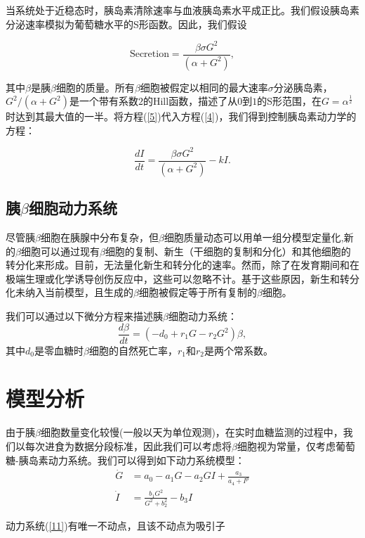 当系统处于近稳态时，胰岛素清除速率与血液胰岛素水平成正比。我们假设胰岛素分泌速率模拟为葡萄糖水平的S形函数\cite{topp2000model}。因此，我们假设

\begin{equation}\label{5}
\text{Secretion} = \frac{\beta\sigma G^2}{(\alpha + G^2)},
\end{equation}

其中$\beta$是胰$\beta$细胞的质量。所有$\beta$细胞被假定以相同的最大速率$\sigma$分泌胰岛素，\(G^2/(\alpha + G^2)\)是一个带有系数$2$的Hill函数，描述了从$0$到$1$的S形范围，在$G=\alpha^{\frac{1}{2}}$时达到其最大值的一半。将方程(\ref{5})代入方程(\ref{4})，我们得到控制胰岛素动力学的方程：

\begin{equation}
    \frac{dI}{dt} = \frac{\beta\sigma G^2}{(\alpha + G^2)} - kI.
\end{equation}

\subsection{胰\(\beta\)细胞动力系统}
尽管胰$\beta$细胞在胰腺中分布复杂，但$\beta$细胞质量动态可以用单一组分模型定量化,新的$\beta$细胞可以通过现有$\beta$细胞的复制、新生（干细胞的复制和分化）和其他细胞的转分化来形成。目前，无法量化新生和转分化的速率。然而，除了在发育期间和在极端生理或化学诱导创伤反应中，这些可以忽略不计\cite{finegood1995dynamics}。基于这些原因，新生和转分化未纳入当前模型，且生成的$\beta$细胞被假定等于所有复制的$\beta$细胞。

我们可以通过以下微分方程来描述胰$\beta$细胞动力系统：
\begin{equation}
    \frac{d\beta}{dt} = (-d_0+r_1G-r_2G^2)\beta,
\end{equation}
其中$d_0$是零血糖时$\beta$细胞的自然死亡率，$r_1$和$r_2$是两个常系数\cite{topp2000model}。
\section{模型分析}

由于胰$\beta$细胞数量变化较慢(一般以天为单位观测)，在实时血糖监测的过程中，我们以每次进食为数据分段标准，因此我们可以考虑将$\beta$细胞视为常量，仅考虑葡萄糖-胰岛素动力系统\cite{huard2022mathematical}。我们可以得到如下动力系统模型：
\begin{equation}\label{11}
    \begin{aligned}
        \dot{G} &= a_0-a_1G-a_2GI+\frac{a_3}{a_4+I^p} \\
        \dot{I} &= \frac{b_1 G^2}{G^2 + b_2^2} - b_3 I
    \end{aligned}
\end{equation}
\begin{prop}
    动力系统(\ref{11})有唯一不动点，且该不动点为吸引子
\end{prop}

